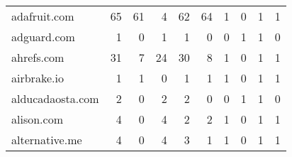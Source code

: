 \begin{tabular}{lrrrrrrrrr}
               adafruit.com &                               65 &                                 61 &                                      4 &                           62 &                          64 &                                   1 &                                      0 &                             1 &                            1 \\
                adguard.com &                                1 &                                  0 &                                      1 &                            1 &                           0 &                                   0 &                                      1 &                             1 &                            0 \\
                 ahrefs.com &                               31 &                                  7 &                                     24 &                           30 &                           8 &                                   1 &                                      0 &                             1 &                            1 \\
                airbrake.io &                                1 &                                  1 &                                      0 &                            1 &                           1 &                                   1 &                                      0 &                             1 &                            1 \\
           alducadaosta.com &                                2 &                                  0 &                                      2 &                            2 &                           0 &                                   0 &                                      1 &                             1 &                            0 \\
                 alison.com &                                4 &                                  0 &                                      4 &                            2 &                           2 &                                   1 &                                      0 &                             1 &                            1 \\
             alternative.me &                                4 &                                  0 &                                      4 &                            3 &                           1 &                                   1 &                                      0 &                             1 &                            1 \\

\end{tabular}
